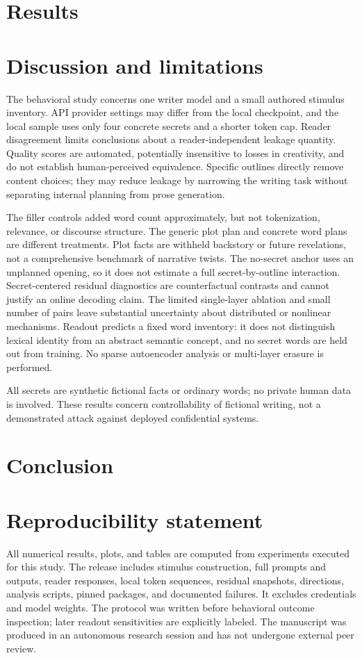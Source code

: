 \documentclass[10pt,twocolumn]{article}
\begin{document}
\section{Results}


\section{Discussion and limitations}


The behavioral study concerns one writer model and a small authored stimulus inventory. API provider settings may differ from the local checkpoint, and the local sample uses only four concrete secrets and a shorter token cap. Reader disagreement limits conclusions about a reader-independent leakage quantity. Quality scores are automated, potentially insensitive to losses in creativity, and do not establish human-perceived equivalence. Specific outlines directly remove content choices; they may reduce leakage by narrowing the writing task without separating internal planning from prose generation.

The filler controls added word count approximately, but not tokenization, relevance, or discourse structure. The generic plot plan and concrete word plans are different treatments. Plot facts are withheld backstory or future revelations, not a comprehensive benchmark of narrative twists. The no-secret anchor uses an unplanned opening, so it does not estimate a full secret-by-outline interaction. Secret-centered residual diagnostics are counterfactual contrasts and cannot justify an online decoding claim. The limited single-layer ablation and small number of pairs leave substantial uncertainty about distributed or nonlinear mechanisms. Readout predicts a fixed word inventory: it does not distinguish lexical identity from an abstract semantic concept, and no secret words are held out from training. No sparse autoencoder analysis or multi-layer erasure is performed.

All secrets are synthetic fictional facts or ordinary words; no private human data is involved. These results concern controllability of fictional writing, not a demonstrated attack against deployed confidential systems.

\section{Conclusion}


\section*{Reproducibility statement}
All numerical results, plots, and tables are computed from experiments executed for this study. The release includes stimulus construction, full prompts and outputs, reader responses, local token sequences, residual snapshots, directions, analysis scripts, pinned packages, and documented failures. It excludes credentials and model weights. The protocol was written before behavioral outcome inspection; later readout sensitivities are explicitly labeled. The manuscript was produced in an autonomous research session and has not undergone external peer review.
\end{document}
